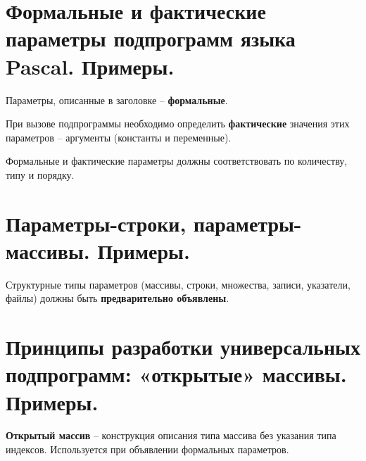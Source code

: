 



\newpage\section{Формальные и фактические параметры подпрограмм языка Pascal. Примеры. }

\begin{myquote}
\end{myquote}

Параметры, описанные в заголовке – {\bf формальные}. 

При вызове подпрограммы необходимо определить {\bf фактические} значения этих параметров – аргументы (константы и переменные).

Формальные и фактические параметры должны соответствовать по количеству, типу и порядку.



\newpage\section{Параметры-строки, параметры-массивы. Примеры. }

\begin{myquote}
\end{myquote}

Структурные типы параметров (массивы, строки, множества, записи, указатели, файлы) должны быть {\bf предварительно объявлены}.





\newpage\section{Принципы разработки универсальных подпрограмм: «открытые» массивы. Примеры. }

\begin{myquote}
            
\end{myquote}

{\bf Открытый массив} – конструкция описания типа массива без указания типа индексов. Используется при объявлении формальных параметров.

